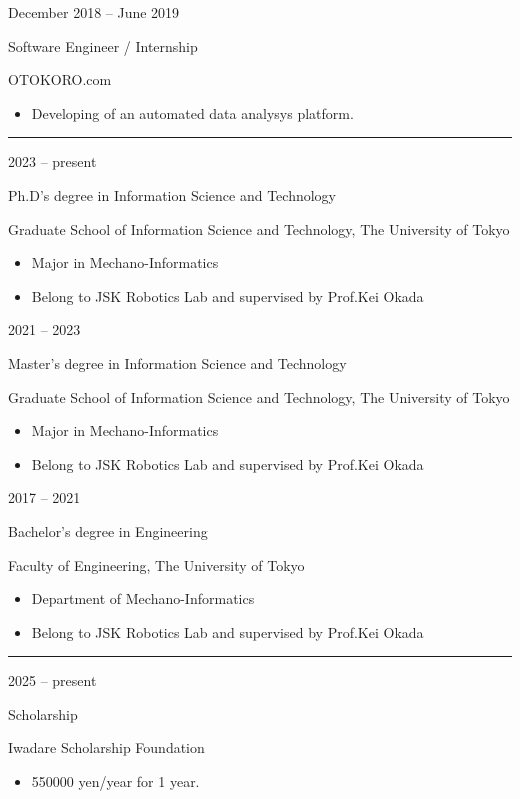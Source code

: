 \documentclass[a4paper,10pt]{article}
\newlength{\cvcolumngapwidth}
\newlength{\cvleftcolumnwidth}
\newlength{\cvrightcolumnwidth}
\newcommand{\cvsectionstyle}[1]{{\normalsize\cvsectionfont\textcolor{cvsectioncolor}{#1}}}
\newcommand{\cvtitlestyle}[1]{{\large\cvtitlefont\textcolor{cvtitlecolor}{#1}}}
\newcommand{\cvdurationstyle}[1]{{\small\cvdurationfont\textcolor{cvdurationcolor}{#1}}}
\newlength{\cvafteritemskipamount}
\newlength{\cvaftersectionskipamount}
\newlength{\cvaftertitleskipamount}
\newlength{\cvparskip}
\newcommand{\cvsection}[1]{
    \begin{minipage}[t]{\cvleftcolumnwidth}
        \raggedleft\cvsectionstyle{#1}
    \end{minipage}%
    \hspace{\cvcolumngapwidth}%
    \begin{minipage}[t]{\cvrightcolumnwidth}
        \textcolor{cvrulecolor}{\rule{\cvrightcolumnwidth}{0.3mm}}
    \end{minipage}

    \vspace{\cvaftersectionskipamount}
}
\newcommand{\cvitem}[2]{
    \begin{minipage}[t]{\cvleftcolumnwidth}
        \raggedleft #1
    \end{minipage}%
    \hspace{\cvcolumngapwidth}%
    \begin{minipage}[t]{\cvrightcolumnwidth}
        \setlength{\parskip}{\cvparskip} #2
    \end{minipage}

    \vspace{\cvafteritemskipamount}
}
\newcommand{\cvtitle}[1]{
    \cvtitlestyle{#1}

    \vspace{\cvaftertitleskipamount}
    \vspace{-\cvparskip}
}
\begin{document}
\cvitem{
  \cvdurationstyle{December 2018 -- June 2019}
}{
  \cvtitle{Software Engineer / Internship}
  OTOKORO.com
  \begin{itemize}[leftmargin=*]
    \item Developing of an automated data analysys platform.
  \end{itemize}
}



\cvsection{EDUCATION}

\cvitem{
    \cvdurationstyle{2023 -- present}
}{
    \cvtitle{Ph.D's degree in Information Science and Technology}

    Graduate School of Information Science and Technology, The University of Tokyo

    \begin{itemize}[leftmargin=*]
        \item Major in Mechano-Informatics
        \item Belong to JSK Robotics Lab and supervised by Prof.Kei Okada
    \end{itemize}
}

\cvitem{
    \cvdurationstyle{2021 -- 2023}
}{
    \cvtitle{Master's degree in Information Science and Technology}

    Graduate School of Information Science and Technology, The University of Tokyo

    \begin{itemize}[leftmargin=*]
        \item Major in Mechano-Informatics
        \item Belong to JSK Robotics Lab and supervised by Prof.Kei Okada
    \end{itemize}
}

\cvitem{
    \cvdurationstyle{2017 -- 2021}
}{
    \cvtitle{Bachelor's degree in Engineering}

    Faculty of Engineering, The University of Tokyo

    \begin{itemize}[leftmargin=*]
        \item Department of Mechano-Informatics
        \item Belong to JSK Robotics Lab and supervised by Prof.Kei Okada
    \end{itemize}
}


\cvsection{SCHOLARSHIPS}

\cvitem{
    \cvdurationstyle{2025 -- present}
}{
    \cvtitle{Scholarship}

    Iwadare Scholarship Foundation

    \begin{itemize}[leftmargin=*]
        \item 550000 yen/year for 1 year.
    \end{itemize}
}
\end{document}
